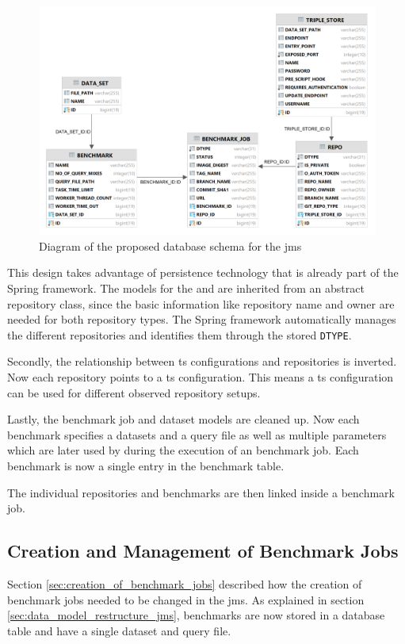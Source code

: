 \begin{figure}[tbph]
	\centering
	\includegraphics[width=.75\textwidth]{figures/jms_db_schema_design.png}
	\caption{Diagram of the proposed database schema for the \ac{jms}}
	\label{fig:design_jms_db_schema}
\end{figure}

This design takes advantage of persistence technology that is already part of the Spring framework.
The models for the \gh{} and \dockh{} are inherited from an abstract repository class, since the basic information like repository name and owner are needed for both repository types.
The Spring framework automatically manages the different repositories and identifies them through the stored \texttt{DTYPE}.

Secondly, the relationship between \ac{ts} configurations and repositories is inverted. 
Now each repository points to a \ac{ts} configuration.
This means a \ac{ts} configuration can be used for different observed repository setups.

Lastly, the benchmark job and dataset models are cleaned up.
Now each benchmark specifies a datasets and a query file as well as multiple parameters which are later used by \iguana{} during the execution of an benchmark job.
Each benchmark is now a single entry in the benchmark table.

The individual repositories and benchmarks are then linked inside a benchmark job.


\subsection{Creation and Management of Benchmark Jobs}
\label{sec:creation_of_benchmark_jobs_design}
Section \ref{sec:creation_of_benchmark_jobs} described how the creation of benchmark jobs needed to be changed in the \ac{jms}.
As explained in section \ref{sec:data_model_restructure_jms}, benchmarks are now stored in a database table and have a single dataset and query file.

